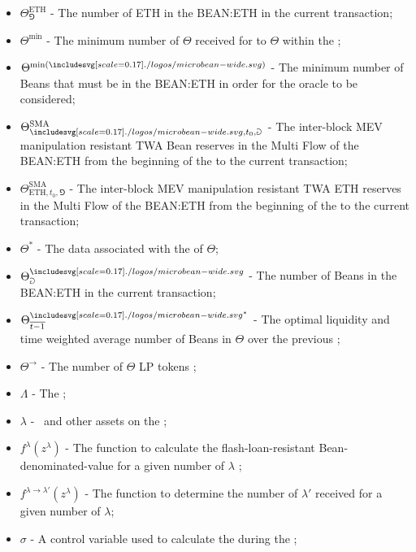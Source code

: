 \documentclass[class=article, crop=false]{standalone}
\begin{document}
\begin{itemize}[topsep=0pt, itemsep=3pt,leftmargin=16pt]
    \item[] $\Theta_{\Game}^{\text{ETH}}$ - The number of ETH in the BEAN:ETH  in the current transaction;
    \item[] $\Theta^{\text{min}}$ - The minimum number of $\Theta$ received for  to  $\Theta$ within the ;
    \item[] $\Theta^{\text{min}(\bean)}$ - The minimum number of Beans that must be in the BEAN:ETH  in order for the oracle to be considered;
    \item[] $\Theta^{\text{SMA}}_{\bean,t_0,\Game}$ - The inter-block MEV manipulation resistant TWA Bean reserves in the Multi Flow  of the BEAN:ETH  from the beginning of the  to the current transaction;
    \item[] $\Theta^{\text{SMA}}_{\text{ETH},t_0,\Game}$ - The inter-block MEV manipulation resistant TWA ETH reserves in the Multi Flow  of the BEAN:ETH  from the beginning of the  to the current transaction;
    \item[] $\Theta^{*}$ - The data associated with the  of $\Theta$;
    \item[] $\Theta_{\Game}^{\bean}$ - The number of Beans in the BEAN:ETH  in the current transaction;
    \item[] $\Theta_{\overline{t-1}}^{{\bean}^*}$ - The optimal liquidity and time weighted average number of Beans in $\Theta$ over the previous ;
    \item[] $\Theta^{\rightarrow}$ - The number of $\Theta$ LP tokens ;
    \item[] $\Lambda$ - \hypertarget{ht127}{The };
    \item[] $\lambda$ - \hypertarget{ht126}{\Bean\ and other assets on the };
    \item[] $f^{\lambda}(z^{\lambda})$ - \hypertarget{ht84}{The function to calculate the flash-loan-resistant Bean-denominated-value for a given number of $\lambda$ };
    \item[] $f^{\lambda \rightarrow \lambda'}(z^{\lambda})$ - \hypertarget{ht83}{The function to determine the number of $\lambda'$ received for  a given number of $\lambda$};
    \item[] $\sigma$ - A control variable used to calculate the  during the ;

\end{itemize}
\end{document}
